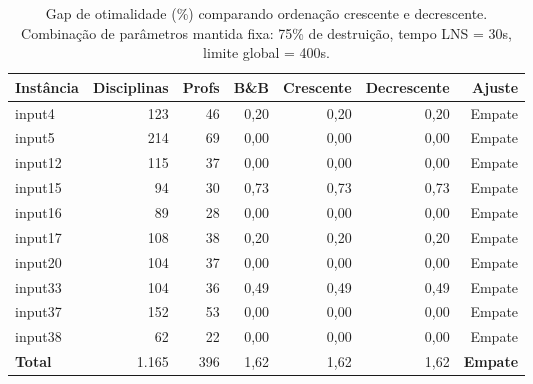 
\begin{table}[htbp]
\centering
\caption{Gap de otimalidade (\%) comparando ordenação crescente e decrescente. Combinação de parâmetros mantida fixa: 75\% de destruição, tempo LNS = 30s, limite global = 400s.}
\label{tab:lns_order_gap}
\small
\begin{tabular}{@{}lrrrrrr@{}}
\toprule
\textbf{Instância} & \textbf{Disciplinas} & \textbf{Profs} & \textbf{B\&B} & \textbf{Crescente} & \textbf{Decrescente} & \textbf{Ajuste} \\
\midrule
input4  & 123 & 46 & 0,20 & 0,20 & 0,20 & Empate \\
input5  & 214 & 69 & 0,00 & 0,00 & 0,00 & Empate \\
input12 & 115 & 37 & 0,00 & 0,00 & 0,00 & Empate \\
input15 & 94  & 30 & 0,73 & 0,73 & 0,73 & Empate \\
input16 & 89  & 28 & 0,00 & 0,00 & 0,00 & Empate \\
input17 & 108 & 38 & 0,20 & 0,20 & 0,20 & Empate \\
input20 & 104 & 37 & 0,00 & 0,00 & 0,00 & Empate \\
input33 & 104 & 36 & 0,49 & 0,49 & 0,49 & Empate \\
input37 & 152 & 53 & 0,00 & 0,00 & 0,00 & Empate \\
input38 & 62  & 22 & 0,00 & 0,00 & 0,00 & Empate \\
\midrule
\textbf{Total}  & 1.165 & 396 & 1,62 & 1,62 & 1,62 & \textbf{Empate} \\
\bottomrule
\end{tabular}
\end{table}
